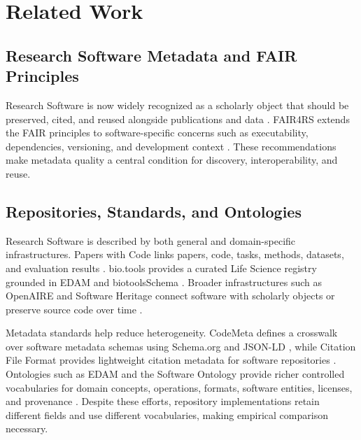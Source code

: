 \documentclass[pdflatex,sn-mathphys-num]{sn-jnl}
\theoremstyle{thmstyleone}%
\theoremstyle{thmstyletwo}%
\theoremstyle{thmstylethree}%
\begin{document}
\section{Related Work}
\label{sec:related}

\subsection{Research Software Metadata and FAIR Principles}
\label{subsec:related-rs-metadata}

Research Software is now widely recognized as a scholarly object that should be preserved, cited, and reused alongside publications and data \cite{Katz2014,Smith2016SoftwareCitation}. FAIR4RS extends the FAIR principles to software-specific concerns such as executability, dependencies, versioning, and development context \cite{Lamprecht2020FAIRSoftware,Barker2022FAIR4RS,FAIR4RS2022Principles}. These recommendations make metadata quality a central condition for discovery, interoperability, and reuse.

\subsection{Repositories, Standards, and Ontologies}
\label{subsec:related-registries}

Research Software is described by both general and domain-specific infrastructures. Papers with Code links papers, code, tasks, methods, datasets, and evaluation results \cite{PapersWithCodeWebsite}. bio.tools provides a curated Life Science registry grounded in EDAM and biotoolsSchema \cite{Ison2013EDAM,Ison2019BioTools,Ison2021BioToolsSchema}. Broader infrastructures such as OpenAIRE and Software Heritage connect software with scholarly objects or preserve source code over time \cite{Manghi2023OpenAIRE,DiCosmo2020SWH}.

Metadata standards help reduce heterogeneity. CodeMeta defines a crosswalk over software metadata schemas using Schema.org and JSON-LD \cite{Jones2019CodeMeta}, while Citation File Format provides lightweight citation metadata for software repositories \cite{Druskat2021CFF}. Ontologies such as EDAM and the Software Ontology provide richer controlled vocabularies for domain concepts, operations, formats, software entities, licenses, and provenance \cite{Ison2013EDAM,Malone2014SWO}. Despite these efforts, repository implementations retain different fields and use different vocabularies, making empirical comparison necessary.
\end{document}
